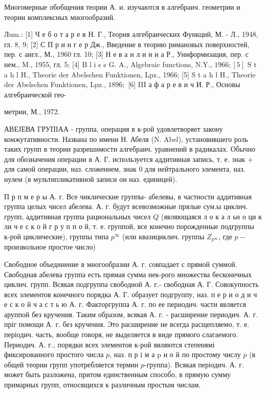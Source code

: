 \documentclass[10pt]{article}
\begin{document}
Многомерные обобщения теории А. и. изучаются в алгебраич. геометрии и теории комплексных многообразий.



Лum.: [1] Ч е б о т а р е в Н. Г., Теория алгебраических Функций, М. - Л., 1948, гл. 8, 9; [2] С П р и н г е р Дж., Введение в теорию римановых поверхностей, пер. с англ., М., 1960 гл. 10; [3] Н е в а н л и н н а Р., Униформизация, пер. с нем., M., 1955, гл. 5; [4] B l i s s G. A., Algebraic functions, N.Y., $1966 ;[5]$ S t a h l H., Theorie der Abelschen Funktionen, Lpz., 1966; [5] S t a h l H., Theorie der Abelschen Funktionen, Lpz., $1896 ;$ [6] III а ф а р е в и ч И. Р., Основы алгебраической гео-

метрии, М., 1972.



АВЕЈЕВА ГРУПIАА - группа, операция в к-рой удовлетворяет закону комжутативности. Названа по имени Н. Абеля (N. Abel), установившего роль таких групп в теории разрешимости алгебраич. уравнений в радикалах. Обычно для обозначения операции в А. Г. используется аддитивная запись, т. е. знак + для самой операции, наз. сложением, знак 0 для нейтрального элемента, наз. нулем (в мультипликативной записи он наз. единицей).



П р п м е р ы А. г. Все чиклические группы- абелевы, в частности аддитивная группа целых чисел абелева. А. г. будут всевозможные прялые сум.ы циклич. групп, аддитивная группа рациональных чисел $Q$ (являющаяся л $о$ к а л ьн о ци к ли ч е с к о й г р у п п о й, т. е. группой, все конечно порожденные подгруппы к-рой циклические), группы типа $p^{\infty}$ (или квазициклич. группы $Z_{p^{\infty}}$, где $p-$ произвольное простое число)



Свободное объединение в многообразии А. г. совпадает с прямой суммой. Свободная абелева группа есть прямая сумма нек-рого множества бесконечных циклич. групп. Всякая подгруппа свободной А. г.- свободная А. Г. Совокупность всех элементов конечного порядка А. Г. образует подгруппу, наз. п е р и о д и ч е с к о й ч а с т ь ю А. г. Факторгруппа А. г. по ее периодич. части является аруппой без кручения. Таким образом, всякая А. г. - расширение периодич. А. г. пріг помощи А. г. без кручения. Это расширение не всегда расщепляемо, т. е. періодич. часть, вообще говоря, не выделяется в виде прямого слагаемого. Периодич. А. г., порядки всех элементов к-рой являются степенямі фиксированного простого числа $p$, наз. п р і м а $\mathrm{p}$ н о й по простому числу $p$ (в общей теории групп употребляется термин $p$-группа). Всякая періодич. А. г. может быть разложена, притом единственным способ́о, в прямую сумму примарных групп, относящихся к различным простым числам.
\end{document}
